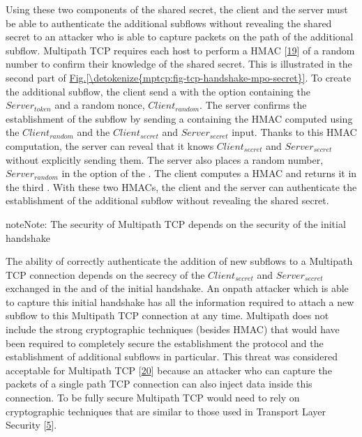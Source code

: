 \documentclass[letterpaper,10pt,english]{sphinxmanual}
\begin{document}
Using these two components of the shared secret, the client and the server must be able to authenticate the additional subflows without revealing the shared secret to an attacker who is able to capture packets on the path of the additional subflow. Multipath TCP requires each host to perform a HMAC {[}\hyperlink{cite.biblio:id2034}{19}{]} of a random number to confirm their knowledge of the shared secret. This is illustrated in the second part of \hyperref[\detokenize{mptcp:fig-tcp-handshake-mpo-secret}]{Fig.\@ \ref{\detokenize{mptcp:fig-tcp-handshake-mpo-secret}}}. To create the additional subflow, the client send a  with the  option containing the \(Server_{token}\) and a random nonce, \(Client_{random}\). The server confirms the establishment of the subflow by sending a  containing the HMAC computed using the \(Client_{random}\) and the \(Client_{secret}\) and \(Server_{secret}\) input. Thanks to this HMAC computation, the server can reveal that it knows \(Client_{secret}\) and \(Server_{secret}\) without explicitly sending them. The server also places a random number, \(Server_{random}\) in the  option of the . The client computes a HMAC and returns it in the third . With these two HMACs, the client and the server can authenticate the establishment of the additional subflow without revealing the shared secret.

\begin{sphinxadmonition}{note}{Note:}
\sphinxAtStartPar
The security of Multipath TCP depends on the security of the initial handshake

\sphinxAtStartPar
The ability of correctly authenticate the addition of new subflows to a Multipath TCP connection depends on the secrecy of the \(Client_{secret}\) and \(Server_{secret}\) exchanged in the  and  of the initial handshake. An on\sphinxhyphen{}path attacker which is able to capture this initial handshake has all the information required to attach a new subflow to this Multipath TCP connection at any time. Multipath does not include the strong cryptographic techniques (besides HMAC) that would have been required to completely secure the establishment the protocol and the establishment of additional subflows in particular. This threat was considered acceptable for Multipath TCP {[}\hyperlink{cite.biblio:id6032}{20}{]} because an attacker who can capture the packets of a single path TCP connection can also inject data inside this connection. To be fully secure Multipath TCP would need to rely on cryptographic techniques that are similar to those used in Transport Layer Security {[}\hyperlink{cite.biblio:id8271}{5}{]}.
\end{sphinxadmonition}
\end{document}
